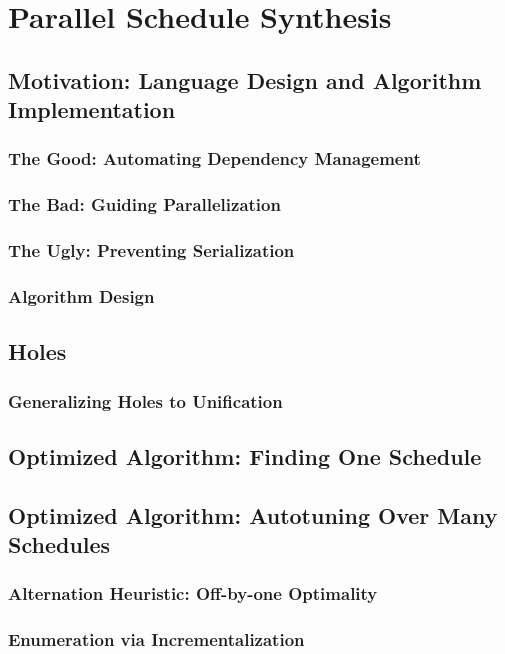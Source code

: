 \chapter{Parallel Schedule Synthesis}
\label{chap:4}

\section{Motivation: Language Design and Algorithm Implementation}
\subsection{The Good: Automating Dependency Management}
\subsection{The Bad: Guiding Parallelization}
\subsection{The Ugly: Preventing Serialization}
\subsection{Algorithm Design}

\section{Holes}
\label{sec:holes}
\subsection{Generalizing Holes to Unification}

\section{Optimized Algorithm: Finding One Schedule}

\section{Optimized Algorithm: Autotuning Over Many Schedules}
\label{sec:schedtuning}
\subsection{Alternation Heuristic: Off-by-one Optimality}
\subsection{Enumeration via Incrementalization}

